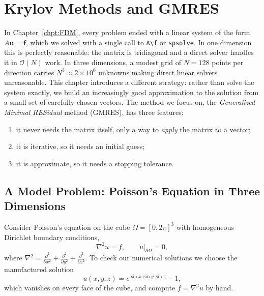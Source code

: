 \chapter{Krylov Methods and GMRES}
\label{chpt:GMRES}



In Chapter~\ref{chpt:FDM}, every problem ended with a linear system of the form
$A\mathbf{u} = \mathbf{f}$, which we solved with a single call to
\texttt{A\textbackslash f} or \texttt{spsolve}. In one dimension this is
perfectly reasonable: the matrix is tridiagonal and a direct solver handles it
in $\mathcal{O}(N)$ work. In three dimensions, a modest grid
of $N = 128$ points per direction carries $N^3 \approx 2\times10^6$
unknowns making direct linear solvers unreasonable. This chapter introduces a different
strategy: rather than solve the system exactly, we build an increasingly good
approximation to the solution from a small set of carefully chosen vectors.
The method we focus on, the \emph{Generalized Minimal RESidual} method
(GMRES), has three features:
\begin{enumerate}
  \item it never needs the matrix itself, only a way to \emph{apply} the matrix
        to a vector;
  \item it is iterative, so it needs an initial guess;
  \item it is approximate, so it needs a stopping tolerance.
\end{enumerate}

\section{A Model Problem: Poisson's Equation in Three Dimensions}
\label{sec:gmres-model}

Consider Poisson's equation on the cube $\Omega = [0,2\pi]^3$ with homogeneous
Dirichlet boundary conditions,
\begin{equation}
  \nabla^2 u = f, \qquad
  u \Big|_{\partial\Omega} = 0,
  \label{eq:gmres-poisson}
\end{equation}
where
$\nabla^2 = \frac{\partial^2}{\partial x^2} + \frac{\partial^2}{\partial y^2}
+ \frac{\partial^2}{\partial z^2}$.
To check our numerical solutions we choose the manufactured solution
\begin{equation}
  u(x,y,z) = e^{\sin x \,\sin y\, \sin z} - 1,
  \label{eq:gmres-exact}
\end{equation}
which vanishes on every face of the cube, and compute $f = \nabla^2 u$ by hand.

